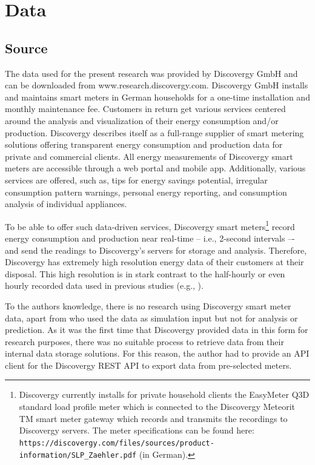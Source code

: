 
\section{Data}\label{Sec:Data}




\subsection{Source}\label{Sec:Data;Subsec:Source}

The data used for the present research was provided by Discovergy GmbH and can be downloaded from www.research.discovergy.com. Discovergy GmbH installs and maintains smart meters in German households for a one-time installation and monthly maintenance fee. Customers in return get various services centered around the analysis and visualization of their energy consumption and/or production. Discovergy describes itself as a full-range supplier of smart metering solutions offering transparent energy consumption and production data for private and commercial clients. All energy measurements of Discovergy smart meters are accessible through a web portal and mobile app. Additionally, various services are offered, such as, tips for energy savings potential, irregular consumption pattern warnings, personal energy reporting, and consumption analysis of individual appliances.

To be able to offer such data-driven services, Discovergy smart meters\footnote{Discovergy currently installs for private household clients the EasyMeter Q3D standard load profile meter which is connected to the Discovergy Meteorit TM smart meter gateway which records and transmits the recordings to Discovergy servers. The meter specifications can be found here: \texttt{https://discovergy.com/files/sources/product-information/SLP\_Zaehler.pdf} (in German).} record energy consumption and production near real-time -- i.e., 2-second intervals –- and send the readings to Discovergy's servers for storage and analysis. Therefore, Discovergy has extremely high resolution energy data of their customers at their disposal. This high resolution is in stark contrast to the half-hourly or even hourly recorded data used in previous studies (e.g., \cite{Arora:2016,Auder:2018,Shi:2017,Gerossier:2017}).

To the authors knowledge, there is no research using Discovergy smart meter data, apart from \cite{Teixeira:2017} who used the data as simulation input but not for analysis or prediction. As it was the first time that Discovergy provided data in this form for research purposes, there was no suitable process to retrieve data from their internal data storage solutions. For this reason, the author had to provide an API client for the Discovergy REST API to export data from pre-selected meters.


